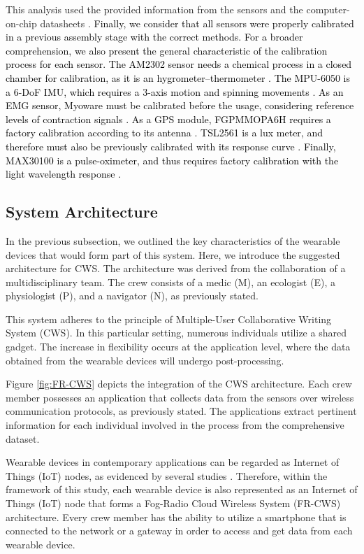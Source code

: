 This analysis used the provided information from the sensors and the computer-on-chip datasheets \cite{dht22, mpu6050, max30100, fgpmmopa6h, tsl2561, raspizerow}. \textcolor{black}{Finally, we consider that all sensors were properly calibrated in a previous assembly stage with the correct methods. For a broader comprehension, we also present the general characteristic of the calibration process for each sensor. The AM2302 sensor needs a chemical process in a closed chamber for calibration, as it is an hygrometer--thermometer \cite{waters2015updated}. The MPU-6050 is a 6-DoF IMU, which requires a 3-axis motion and spinning movements \cite{yadav2016fast}. As an EMG sensor, Myoware must be calibrated before the usage, considering reference levels of contraction signals \cite{oberg1995muscle}. As a GPS module, FGPMMOPA6H requires a factory calibration according to its antenna \cite{menge1998results}. TSL2561 is a lux meter, and therefore must also be previously calibrated with its response curve \cite{schrama1999novel}. Finally, MAX30100 is a pulse-oximeter, and thus requires factory calibration with the light wavelength response \cite{hayes2001new}.}

\subsection{System Architecture}

In the previous subsection, we outlined the key characteristics of the wearable devices that would form part of this system. Here, we introduce the suggested architecture for CWS. The architecture was derived from the collaboration of a multidisciplinary team. The crew consists of a medic (M), an ecologist (E), a physiologist (P), and a navigator (N), as previously stated.

This system adheres to the principle of Multiple-User Collaborative Writing System (CWS). In this particular setting, numerous individuals utilize a shared gadget. The increase in flexibility occurs at the application level, where the data obtained from the wearable devices will undergo post-processing. 

Figure \ref{fig:FR-CWS} depicts the integration of the CWS architecture. Each crew member possesses an application that collects data from the sensors over wireless communication protocols, as previously stated. The applications extract pertinent information for each individual involved in the process from the comprehensive dataset.

Wearable devices in contemporary applications can be regarded as Internet of Things (IoT) nodes, as evidenced by several studies \cite{wu2018we, varatharajan2018wearable, roopaei2018wearable, li2019wearable, nousias2018uncertainty, gia2018energy}. Therefore, within the framework of this study, each wearable device is also represented as an Internet of Things (IoT) node that forms a Fog-Radio Cloud Wireless System (FR-CWS) architecture. Every crew member has the ability to utilize a smartphone that is connected to the network or a gateway in order to access and get data from each wearable device.


